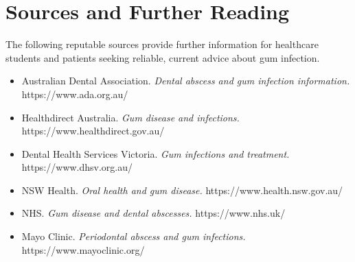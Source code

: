 \section*{Sources and Further Reading}
The following reputable sources provide further information for healthcare students and patients seeking reliable, current advice about gum infection.

\begin{itemize}
    \item Australian Dental Association. \textit{Dental abscess and gum infection information.} https://www.ada.org.au/
    \item Healthdirect Australia. \textit{Gum disease and infections.} https://www.healthdirect.gov.au/
    \item Dental Health Services Victoria. \textit{Gum infections and treatment.} https://www.dhsv.org.au/
    \item NSW Health. \textit{Oral health and gum disease.} https://www.health.nsw.gov.au/
    \item NHS. \textit{Gum disease and dental abscesses.} https://www.nhs.uk/
    \item Mayo Clinic. \textit{Periodontal abscess and gum infections.} https://www.mayoclinic.org/
\end{itemize}
